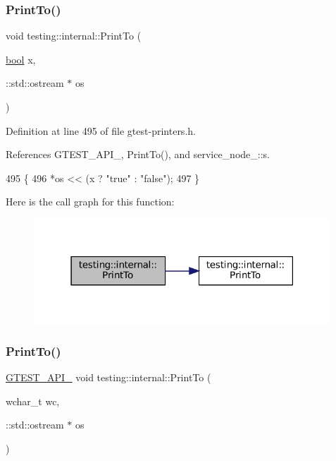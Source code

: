 \subsubsection{\texorpdfstring{Print\+To()}{PrintTo()}\hspace{0.1cm}{\footnotesize\ttfamily [8/20]}}
{\footnotesize\ttfamily void testing\+::internal\+::\+Print\+To (\begin{DoxyParamCaption}\item[{\hyperlink{classbool}{bool}}]{x,  }\item[{\+::std\+::ostream $\ast$}]{os }\end{DoxyParamCaption})\hspace{0.3cm}{\ttfamily [inline]}}



Definition at line 495 of file gtest-\/printers.\+h.



References G\+T\+E\+S\+T\+\_\+\+A\+P\+I\+\_\+, Print\+To(), and service\+\_\+node\+\_\+::s.


\begin{DoxyCode}
495                                             \{
496   *os << (x ? \textcolor{stringliteral}{"true"} : \textcolor{stringliteral}{"false"});
497 \}
\end{DoxyCode}
Here is the call graph for this function\+:
\nopagebreak
\begin{figure}[H]
\begin{center}
\leavevmode
\includegraphics[width=316pt]{namespacetesting_1_1internal_a2979ac1ad3e05c51dcd7dca2eb34e6ce_cgraph}
\end{center}
\end{figure}
\mbox{\label{namespacetesting_1_1internal_a6c50fd437a2ae2ff6f182ccd6c2744dd}} 
\subsubsection{\texorpdfstring{Print\+To()}{PrintTo()}\hspace{0.1cm}{\footnotesize\ttfamily [9/20]}}
{\footnotesize\ttfamily \hyperlink{gtest-port_8h_aa73be6f0ba4a7456180a94904ce17790}{G\+T\+E\+S\+T\+\_\+\+A\+P\+I\+\_\+} void testing\+::internal\+::\+Print\+To (\begin{DoxyParamCaption}\item[{wchar\+\_\+t}]{wc,  }\item[{\+::std\+::ostream $\ast$}]{os }\end{DoxyParamCaption})}

